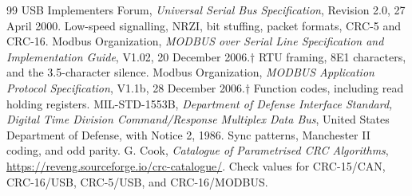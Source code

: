 \documentclass[11pt]{article}
\begin{document}
\begin{thebibliography}{99}
 USB Implementers Forum, \emph{Universal Serial Bus Specification}, Revision 2.0, 27 April 2000. Low-speed signalling, NRZI, bit stuffing, packet formats, CRC-5 and CRC-16.
 Modbus Organization, \emph{MODBUS over Serial Line Specification and Implementation Guide}, V1.02, 20 December 2006.$\dagger$ RTU framing, 8E1 characters, and the 3.5-character silence.
 Modbus Organization, \emph{MODBUS Application Protocol Specification}, V1.1b, 28 December 2006.$\dagger$ Function codes, including read holding registers.
 MIL-STD-1553B, \emph{Department of Defense Interface Standard, Digital Time Division Command/Response Multiplex Data Bus}, United States Department of Defense, with Notice 2, 1986. Sync patterns, Manchester II coding, and odd parity.
 G. Cook, \emph{Catalogue of Parametrised CRC Algorithms}, \url{https://reveng.sourceforge.io/crc-catalogue/}. Check values for CRC-15/CAN, CRC-16/USB, CRC-5/USB, and CRC-16/MODBUS.
\end{thebibliography}
\end{document}
